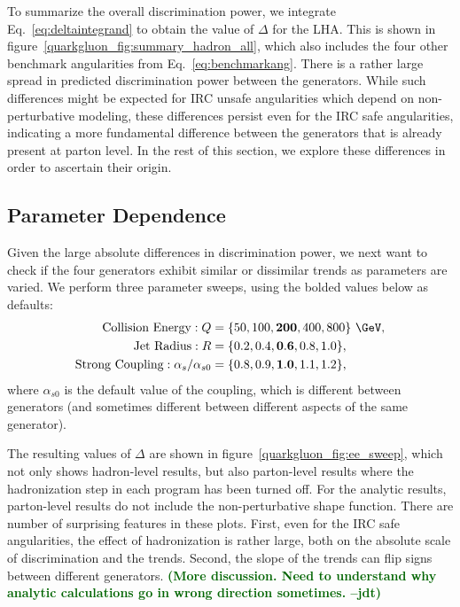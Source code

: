 \documentclass[11pt]{cernrep}
\newcommand{\jdt}[1]{\textbf{\textcolor{darkgreen}{(#1 --jdt)}}}
\begin{document}
To summarize the overall discrimination power, we integrate Eq.~\eqref{eq:deltaintegrand} to obtain the value of $\Delta$ for the LHA.  This is shown in figure~\ref{quarkgluon_fig:summary_hadron_all}, which also includes the four other benchmark angularities from Eq.~\eqref{eq:benchmarkang}.  There is a rather large spread in predicted discrimination power between the generators.  While such differences might be expected for IRC unsafe angularities which depend on non-perturbative modeling, these differences persist even for the IRC safe angularities, indicating a more fundamental difference between the generators that is already present at parton level.  In the rest of this section, we explore these differences in order to ascertain their origin.

\subsection{Parameter Dependence}
\label{quarkgluon_sec:ee_scales}

Given the large absolute differences in discrimination power, we next want to check if the four generators exhibit similar or dissimilar trends as parameters are varied.  We perform three parameter sweeps, using the bolded values below as defaults:
\begin{equation}
\begin{aligned}
\text{Collision Energy}: Q &= \{ 50, 100, \mathbf{200}, 400, 800\}~\GeV, \\
\text{Jet Radius}: R &= \{ 0.2, 0.4, \mathbf{0.6}, 0.8, 1.0\}, \\
\text{Strong Coupling}: \alpha_s / \alpha_{s0} &= \{0.8,0.9,\mathbf{1.0},1.1,1.2\}, \\
\end{aligned}
\end{equation}
where $\alpha_{s0}$ is the default value of the coupling, which is different between generators (and sometimes different between different aspects of the same generator).

The resulting values of $\Delta$ are shown in figure~\ref{quarkgluon_fig:ee_sweep}, which not only shows hadron-level results, but also parton-level results where the hadronization step in each program has been turned off.  For the analytic results, parton-level results do not include the non-perturbative shape function.   There are number of surprising features in these plots.  First, even for the IRC safe angularities, the effect of hadronization is rather large, both on the absolute scale of discrimination and the trends.  Second, the slope of the trends can flip signs between different generators.  \jdt{More discussion.  Need to understand why analytic calculations go in wrong direction sometimes.}
\end{document}
